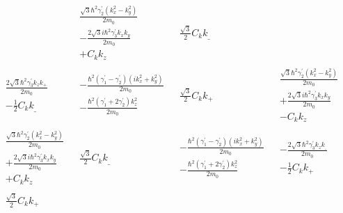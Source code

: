 \begin{align*}
\begin{array}{c|c|c|c}
\begin{array}{c}
\end{array}
&\begin{array}{c}
\frac{\sqrt{3}\hbar^2\gamma_2^{'}(k_x^2 -k_y^2)}{2m_0} \\
-\frac{2\sqrt{3}i\hbar^2\gamma_3^{'}k_xk_y}{2m_0}\\
+C_kk_z
\end{array}
&\begin{array}{c}
\frac{\sqrt{3}}{2}C_kk_\_
\end{array}
\\ \hline
\begin{array}{c}
\frac{2\sqrt{3}\hbar^2\gamma_3^{'}k_zk_+}{2m_0} \\
-\frac{1}{2}C_kk_\_
\end{array}
&\begin{array}{c}
 -\frac{\hbar^2(\gamma_1^{'} -\gamma_2^{'})(ik_x^2 +k_y^2)}{2m_0}\\
-\frac{\hbar^2(\gamma_1^{'}+2\gamma_2^{'})k_z^2}{2m_0} 
\end{array}
&\begin{array}{c}
\frac{\sqrt{3}}{2}C_kk_+
\end{array}
&\begin{array}{c}
\frac{\sqrt{3}\hbar^2\gamma_2^{'}(k_x^2 -k_y^2)}{2m_0} \\
+\frac{2\sqrt{3}i\hbar^2\gamma_3^{'}k_xk_y}{2m_0}\\
-C_kk_z
\end{array}
\\ \hline
\begin{array}{c}
\frac{\sqrt{3}\hbar^2\gamma_2^{'}(k_x^2 -k_y^2)}{2m_0} \\
+\frac{2\sqrt{3}i\hbar^2\gamma_3^{'}k_xk_y}{2m_0}\\
+C_kk_z
\end{array}
&\begin{array}{c}
\frac{\sqrt{3}}{2}C_kk_\_
\end{array}
&\begin{array}{c}
-\frac{\hbar^2(\gamma_1^{'}-\gamma_2^{'})(ik_x^2 +k_y^2)}{2m_0}\\
-\frac{\hbar^2(\gamma_1^{'}+2\gamma_2^{'})k_z^2}{2m_0} 
\end{array}
&\begin{array}{c}
- \frac{2\sqrt{3}\hbar^2\gamma_3^{'}k_zk_\_}{2m_0} \\
-\frac{1}{2}C_kk_+
\end{array}
\\ \hline
\begin{array}{c}
\frac{\sqrt{3}}{2}C_kk_+

\end{array}
\end{array}
\end{align*}
